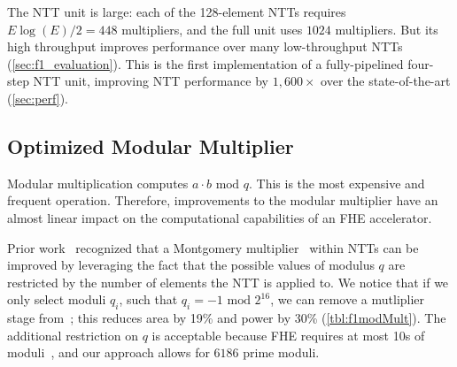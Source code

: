 The NTT unit is large: each of the 128-element NTTs requires $E \log
(E)/2=448$ multipliers, and the full unit uses $1024$ multipliers. But its
high throughput improves performance over many low-throughput NTTs
(\autoref{sec:f1_evaluation}). This is the first implementation of a
fully-pipelined four-step NTT unit, improving NTT performance by $1,600\times$
over the state-of-the-art (\autoref{sec:perf}).


\subsection{Optimized Modular Multiplier}\label{sec:modMult}
\tblFOneModMult

Modular multiplication computes $a\cdot b \textrm{ mod } q$. This is the most
expensive and frequent operation. Therefore, improvements to the modular
multiplier have an almost linear impact on the computational capabilities of an
FHE accelerator.

Prior work~\cite{mert:euromicro19:design} recognized that a Montgomery
multiplier~\cite{montgomery:mom85:modular} within NTTs can be improved by
leveraging the fact that the possible values of modulus $q$ are restricted by
the number of elements the NTT is applied to. We notice that if we only select
moduli $q_i$, such that $q_i = -1 \textrm{ mod } 2^{16}$, we can remove a
mutliplier stage from~\cite{mert:euromicro19:design}; this reduces area by 19\%
and power by 30\% (\autoref{tbl:f1modMult}). The additional restriction on $q$
is acceptable because FHE requires at most 10s of
moduli~\cite{gentry:crypto2012:homomorphic}, and our approach allows for
$6186$ prime moduli.
